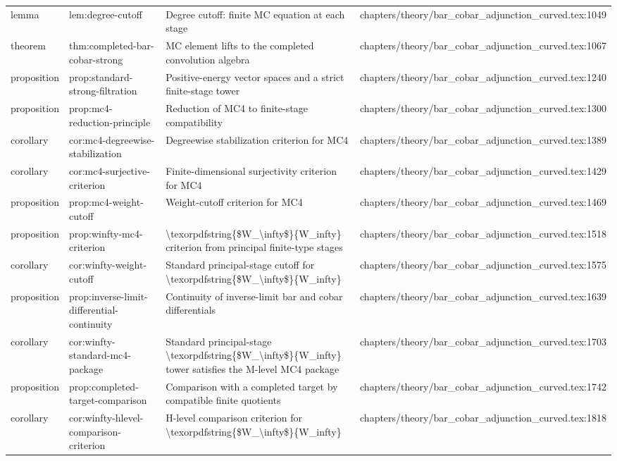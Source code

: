 \documentclass[11pt]{article}
\begin{document}
\begin{longtable}{L{0.10\textwidth}L{0.26\textwidth}L{0.42\textwidth}L{0.22\textwidth}}
lemma & lem:degree-cutoff & Degree cutoff: finite MC equation at each stage & chapters/theory/bar\_cobar\_adjunction\_curved.tex:1049\\
theorem & thm:completed-bar-cobar-strong & MC element lifts to the completed convolution algebra & chapters/theory/bar\_cobar\_adjunction\_curved.tex:1067\\
proposition & prop:standard-strong-filtration & Positive-energy vector spaces and a strict finite-stage tower & chapters/theory/bar\_cobar\_adjunction\_curved.tex:1240\\
proposition & prop:mc4-reduction-principle & Reduction of MC4 to finite-stage compatibility & chapters/theory/bar\_cobar\_adjunction\_curved.tex:1300\\
corollary & cor:mc4-degreewise-stabilization & Degreewise stabilization criterion for MC4 & chapters/theory/bar\_cobar\_adjunction\_curved.tex:1389\\
corollary & cor:mc4-surjective-criterion & Finite-dimensional surjectivity criterion for MC4 & chapters/theory/bar\_cobar\_adjunction\_curved.tex:1429\\
proposition & prop:mc4-weight-cutoff & Weight-cutoff criterion for MC4 & chapters/theory/bar\_cobar\_adjunction\_curved.tex:1469\\
proposition & prop:winfty-mc4-criterion & \textbackslash{}texorpdfstring\{\$W\_\textbackslash{}infty\$\}\{W\_infty\} criterion from principal finite-type stages & chapters/theory/bar\_cobar\_adjunction\_curved.tex:1518\\
corollary & cor:winfty-weight-cutoff & Standard principal-stage cutoff for \textbackslash{}texorpdfstring\{\$W\_\textbackslash{}infty\$\}\{W\_infty\} & chapters/theory/bar\_cobar\_adjunction\_curved.tex:1575\\
proposition & prop:inverse-limit-differential-continuity & Continuity of inverse-limit bar and cobar differentials & chapters/theory/bar\_cobar\_adjunction\_curved.tex:1639\\
corollary & cor:winfty-standard-mc4-package & Standard principal-stage \textbackslash{}texorpdfstring\{\$W\_\textbackslash{}infty\$\}\{W\_infty\} tower satisfies the M-level MC4 package & chapters/theory/bar\_cobar\_adjunction\_curved.tex:1703\\
proposition & prop:completed-target-comparison & Comparison with a completed target by compatible finite quotients & chapters/theory/bar\_cobar\_adjunction\_curved.tex:1742\\
corollary & cor:winfty-hlevel-comparison-criterion & H-level comparison criterion for \textbackslash{}texorpdfstring\{\$W\_\textbackslash{}infty\$\}\{W\_infty\} & chapters/theory/bar\_cobar\_adjunction\_curved.tex:1818\\

\end{longtable}
\end{document}
